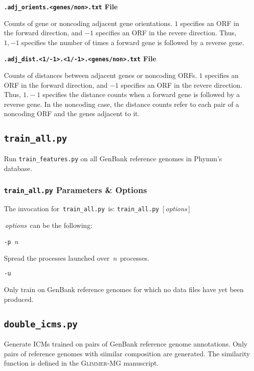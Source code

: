 \documentclass[fleqn,titlepage,11pt]{article}
\def\Desc#1{\,\mbox{\emph{#1}}\,}
\def\Gmg{\textsc{Glimmer-MG}}
\def\Pg#1{\texttt{#1}}
\begin{document}
\smallskip
\noindent\textbf{\Pg{.adj\_orients.<genes/non>.txt} File}
\smallskip

Counts of gene or noncoding adjacent gene orientations. $1$ specifies
an ORF in the forward direction, and $-1$ specifies an ORF in the
revere direction. Thus, $1,-1$ specifies the number of times a forward
gene is followed by a reverse gene.

\smallskip
\noindent\textbf{\Pg{.adj\_dist.<1/-1>.<1/-1>.<genes/non>.txt} File}
\smallskip

Counts of distances between adjacent genes or noncoding ORFs. $1$
specifies an ORF in the forward direction, and $-1$ specifies an ORF
in the revere direction. Thus, $1.-1$ specifies the distance counts
when a forward gene is followed by a reverse gene. In the noncoding
case, the distance counts refer to each pair of a noncoding ORF and
the genes adjacent to it.

\subsection{\Pg{train\_all.py}}

Run \Pg{train\_features.py} on all GenBank reference genomes in
Phymm's database.

\subsubsection{\Pg{train\_all.py} Parameters \& Options}

The invocation for \,\Pg{train\_all.py}\, is:
\bq
  \Pg{train\_all.py}\, [\Desc{options}]
\eq

\Desc{options} can be the following:
\bl{}\RaggedRight

\exdent
  \verb`-p` \Desc{n}

  Spread the processes launched over \Desc{n} processes.

\exdent
  \verb`-u`

  Only train on GenBank reference genomes for which no data files
  have yet been produced.

\el

\subsection{\Pg{double\_icms.py}}

Generate ICMs trained on pairs of GenBank reference genome
annotations. Only pairs of reference genomes with siimilar composition
are generated. The similarity function is defined in the \Gmg{}
manuscript.
\end{document}

